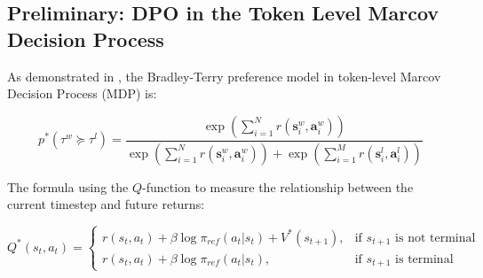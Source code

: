 \subsection{Preliminary: DPO in the Token Level Marcov Decision Process}
\label{app: prel}


As demonstrated in \citet{rafailov2024rqlanguagemodel}, the Bradley-Terry preference model in token-level Marcov Decision Process (MDP) is:

\begin{equation}
p^*\left(\tau^w \succeq \tau^l\right)=\frac{\exp \left(\sum_{i=1}^N r\left(\mathbf{s}_i^w, \mathbf{a}_i^w\right)\right)}{\exp \left(\sum_{i=1}^N r\left(\mathbf{s}_i^w, \mathbf{a}_i^w\right)\right)+\exp \left(\sum_{i=1}^M r\left(\mathbf{s}_i^l, \mathbf{a}_i^l\right)\right)}
\label{eq: tdpo_bt}
\end{equation}

\label{app: tdpo}
The formula using the $Q$-function to measure the relationship between the current timestep and future returns:

\begin{equation}
Q^*(s_t, a_t) =
\begin{cases} 
r(s_t, a_t) + \beta \log \pi_{ref}(a_t | s_t) + V^*(s_{t+1}), & \text{if } s_{t+1} \text{ is not terminal} \\
r(s_t, a_t) + \beta \log \pi_{ref}(a_t | s_t), & \text{if } s_{t+1} \text{ is terminal}
\end{cases}
\label{eq: t_return}
\end{equation}

